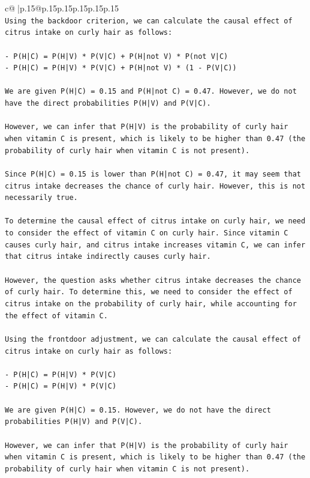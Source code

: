 \documentclass{article}
\begin{document}
{\begin{supertabular}{c@{$\;$}|p{.15\linewidth}@{}p{.15\linewidth}p{.15\linewidth}p{.15\linewidth}p{.15\linewidth}p{.15\linewidth}}
{{{\\ 
\texttt{Using the backdoor criterion, we can calculate the causal effect of citrus intake on curly hair as follows:} \\
\\ 
\texttt{{-} P(H|C) = P(H|V) * P(V|C) + P(H|not V) * P(not V|C)} \\
\texttt{{-} P(H|C) = P(H|V) * P(V|C) + P(H|not V) * (1 {-} P(V|C))} \\
\\ 
\texttt{We are given P(H|C) = 0.15 and P(H|not C) = 0.47. However, we do not have the direct probabilities P(H|V) and P(V|C). } \\
\\ 
\texttt{However, we can infer that P(H|V) is the probability of curly hair when vitamin C is present, which is likely to be higher than 0.47 (the probability of curly hair when vitamin C is not present). } \\
\\ 
\texttt{Since P(H|C) = 0.15 is lower than P(H|not C) = 0.47, it may seem that citrus intake decreases the chance of curly hair. However, this is not necessarily true.} \\
\\ 
\texttt{To determine the causal effect of citrus intake on curly hair, we need to consider the effect of vitamin C on curly hair. Since vitamin C causes curly hair, and citrus intake increases vitamin C, we can infer that citrus intake indirectly causes curly hair.} \\
\\ 
\texttt{However, the question asks whether citrus intake decreases the chance of curly hair. To determine this, we need to consider the effect of citrus intake on the probability of curly hair, while accounting for the effect of vitamin C.} \\
\\ 
\texttt{Using the frontdoor adjustment, we can calculate the causal effect of citrus intake on curly hair as follows:} \\
\\ 
\texttt{{-} P(H|C) = P(H|V) * P(V|C)} \\
\texttt{{-} P(H|C) = P(H|V) * P(V|C)} \\
\\ 
\texttt{We are given P(H|C) = 0.15. However, we do not have the direct probabilities P(H|V) and P(V|C). } \\
\\ 
\texttt{However, we can infer that P(H|V) is the probability of curly hair when vitamin C is present, which is likely to be higher than 0.47 (the probability of curly hair when vitamin C is not present). } \\
}}}
\end{supertabular}}
\end{document}
